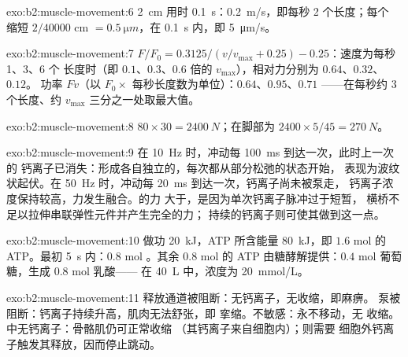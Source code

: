 \begin{solution}{exo:b2:muscle-movement:6}
\qty{2}{cm} 用时 \qty{0.1}{s}：\qty{0.2}{m/s}，即每秒 2 个长度；每个
缩短 $2/\num{40000}$ cm $= \qty{0.5}{\micro m}$，在
\qty{0.1}{s} 内，即 \qty{5}{\micro m/s}。
\end{solution}

\begin{solution}{exo:b2:muscle-movement:7}
$F/F_0 = 0.3125/(v/v_{\max} + 0.25) - 0.25$：速度为每秒 1、3、6 个
长度时（即 $0.1$、$0.3$、$0.6$ 倍的 $v_{\max}$），相对力分别为 $0.64$、$0.32$、$0.12$。
功率 $Fv$（以 $F_0\times$ 每秒长度数为单位）：$0.64$、$0.95$、$0.71$
——在每秒约 3 个长度、约 $v_{\max}$ 三分之一处取最大值。
\end{solution}

\begin{solution}{exo:b2:muscle-movement:8}
$80\times 30 = \qty{2400}{N}$；在脚部为 $2400\times 5/45 =
\qty{270}{N}$。
\end{solution}

\begin{solution}{exo:b2:muscle-movement:9}
在 \qty{10}{Hz} 时，冲动每 \qty{100}{ms} 到达一次，此时上一次的
钙离子已消失：形成各自独立的，每次都从部分松弛的状态开始，
表现为波纹状起伏。在 \qty{50}{Hz} 时，冲动每
\qty{20}{ms} 到达一次，钙离子尚未被泵走，
钙离子浓度保持较高，力发生融合。的力
大于，是因为单次钙离子脉冲过于短暂，
横桥不足以拉伸串联弹性元件并产生完全的力；
持续的钙离子则可使其做到这一点。
\end{solution}

\begin{solution}{exo:b2:muscle-movement:10}
做功 \qty{20}{kJ}，ATP 所含能量 \qty{80}{kJ}，即 $1.6$ mol 的 ATP。最初
\qty{5}{s} 内：$0.8$ mol 。其余 $0.8$ mol 的 ATP
由糖酵解提供：$0.4$ mol 葡萄糖，生成 $0.8$ mol 乳酸——
在 \qty{40}{L} 中，浓度为 \qty{20}{mmol/L}。
\end{solution}

\begin{solution}{exo:b2:muscle-movement:11}
释放通道被阻断：无钙离子，无收缩，即麻痹。
泵被阻断：钙离子持续升高，肌肉无法舒张，即
挛缩。不敏感：永不移动，无
收缩。中无钙离子：骨骼肌仍可正常收缩
（其钙离子来自细胞内）；则需要
细胞外钙离子触发其释放，因而停止跳动。
\end{solution}

